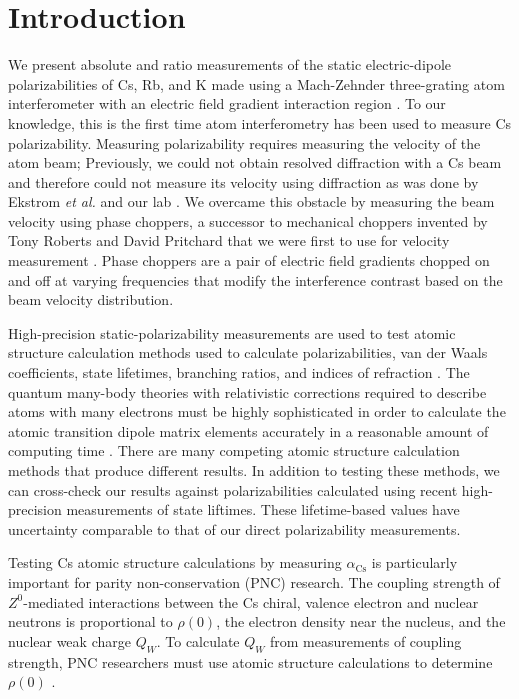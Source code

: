 \documentclass[twocolumn,prl,showpacs,superscriptaddress]{revtex4-1}   %
\newcommand{\acs}{\alpha_{\textrm{Cs}}}
\newcommand{\etal}{\textit{et al. }}
\begin{document}
\maketitle




\section{Introduction}

We present absolute and ratio measurements of the static electric-dipole polarizabilities of Cs, Rb, and K made using a Mach-Zehnder three-grating atom interferometer with an electric field gradient interaction region \cite{Berman1997,Cronin2009}. To our knowledge, this is the first time atom interferometry has been used to measure Cs polarizability. Measuring polarizability requires measuring the velocity of the atom beam; Previously, we could not obtain resolved diffraction with a Cs beam and therefore could not measure its velocity using diffraction as was done by Ekstrom \etal and our lab \cite{Ekstrom1995,Holmgren2010}. We overcame this obstacle by measuring the beam velocity using phase choppers, a successor to mechanical choppers invented by Tony Roberts and David Pritchard \cite{Roberts2002,Roberts2004} that we were first to use for velocity measurement \cite{Holmgren2011}. Phase choppers are a pair of electric field gradients chopped on and off at varying frequencies that modify the interference contrast based on the beam velocity distribution.

High-precision static-polarizability measurements are used to test atomic structure calculation methods used to calculate polarizabilities, van der Waals coefficients, state lifetimes, branching ratios, and indices of refraction \cite{Hilborn2002}. The quantum many-body theories with relativistic corrections required to describe atoms with many electrons must be highly sophisticated in order to calculate the atomic transition dipole matrix elements accurately in a reasonable amount of computing time \cite{Mitroy2010}. There are many competing atomic structure calculation methods that produce different results. In addition to testing these methods, we can cross-check our results against polarizabilities calculated using recent high-precision measurements of state liftimes. These lifetime-based values have uncertainty comparable to that of our direct polarizability measurements.

Testing Cs atomic structure calculations by measuring $\acs$ is particularly important for parity non-conservation (PNC) research. The coupling strength of $Z^0$-mediated interactions between the Cs chiral, valence electron and nuclear neutrons is proportional to $\rho(0)$, the electron density near the nucleus, and the nuclear weak charge $Q_W$. To calculate $Q_W$ from measurements of coupling strength, PNC researchers must use atomic structure calculations to determine $\rho(0)$ \cite{Bouchiat1999,Dzuba2012}. 
\end{document}

